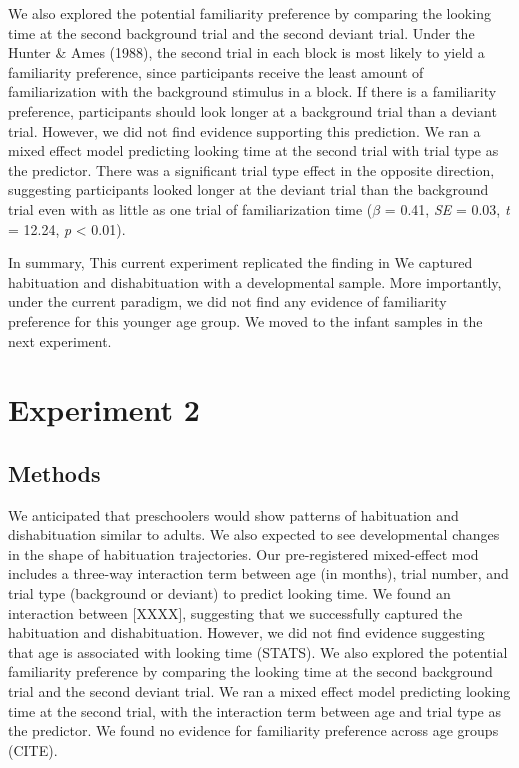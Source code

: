 \documentclass[10pt, letterpaper]{article}
\begin{document}
We also explored the potential familiarity preference by comparing the
looking time at the second background trial and the second deviant
trial. Under the Hunter \& Ames (1988), the second trial in each block
is most likely to yield a familiarity preference, since participants
receive the least amount of familiarization with the background stimulus
in a block. If there is a familiarity preference, participants should
look longer at a background trial than a deviant trial. However, we did
not find evidence supporting this prediction. We ran a mixed effect
model predicting looking time at the second trial with trial type as the
predictor. There was a significant trial type effect in the opposite
direction, suggesting participants looked longer at the deviant trial
than the background trial even with as little as one trial of
familiarization time (\(\beta\) = 0.41, \emph{SE} = 0.03, \emph{t} =
12.24, \emph{p} \textless{} 0.01).

In summary, This current experiment replicated the finding in We
captured habituation and dishabituation with a developmental sample.
More importantly, under the current paradigm, we did not find any
evidence of familiarity preference for this younger age group. We moved
to the infant samples in the next experiment.

\hypertarget{experiment-2}{%
\section{Experiment 2}\label{experiment-2}}

\hypertarget{methods-1}{%
\subsection{Methods}\label{methods-1}}

We anticipated that preschoolers would show patterns of habituation and
dishabituation similar to adults. We also expected to see developmental
changes in the shape of habituation trajectories. Our pre-registered
mixed-effect mod includes a three-way interaction term between age (in
months), trial number, and trial type (background or deviant) to predict
looking time. We found an interaction between {[}XXXX{]}, suggesting
that we successfully captured the habituation and dishabituation.
However, we did not find evidence suggesting that age is associated with
looking time (STATS). We also explored the potential familiarity
preference by comparing the looking time at the second background trial
and the second deviant trial. We ran a mixed effect model predicting
looking time at the second trial, with the interaction term between age
and trial type as the predictor. We found no evidence for familiarity
preference across age groups (CITE).
\end{document}
